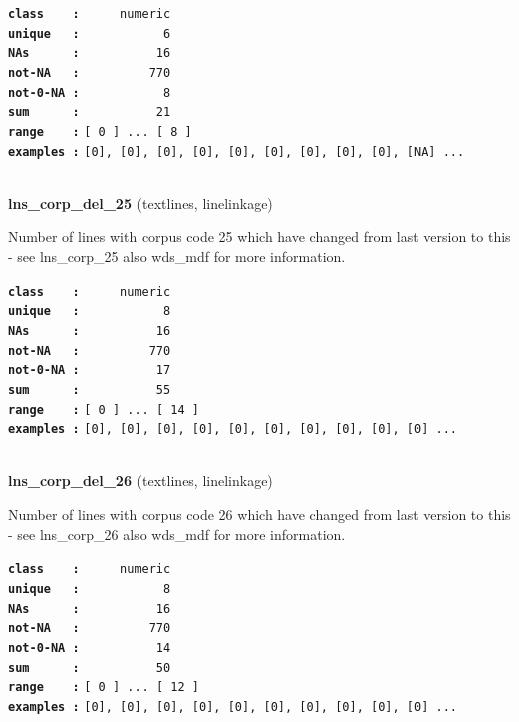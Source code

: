 \documentclass[]{article}
\begin{document}
\textbf{\texttt{class\ \ \ \ :}} \texttt{~~~~~numeric}\\
\textbf{\texttt{unique\ \ \ :}} \texttt{~~~~~~~~~~~6}\\
\textbf{\texttt{NAs\ \ \ \ \ \ :}} \texttt{~~~~~~~~~~16}\\
\textbf{\texttt{not-NA\ \ \ :}} \texttt{~~~~~~~~~770}\\
\textbf{\texttt{not-0-NA\ :}} \texttt{~~~~~~~~~~~8}\\
\textbf{\texttt{sum\ \ \ \ \ \ :}} \texttt{~~~~~~~~~~21}\\
\textbf{\texttt{range\ \ \ \ :}}
\texttt{{[}\ 0\ {]}\ ...\ {[}\ 8\ {]}}\\
\textbf{\texttt{examples\ :}}
\texttt{{[}0{]},\ {[}0{]},\ {[}0{]},\ {[}0{]},\ {[}0{]},\ {[}0{]},\ {[}0{]},\ {[}0{]},\ {[}0{]},\ {[}NA{]}\ ...}\\

~

\textbf{lns\_corp\_del\_25} (textlines, linelinkage)

Number of lines with corpus code 25 which have changed from last version
to this - see lns\_corp\_25 also wds\_mdf for more information.

\textbf{\texttt{class\ \ \ \ :}} \texttt{~~~~~numeric}\\
\textbf{\texttt{unique\ \ \ :}} \texttt{~~~~~~~~~~~8}\\
\textbf{\texttt{NAs\ \ \ \ \ \ :}} \texttt{~~~~~~~~~~16}\\
\textbf{\texttt{not-NA\ \ \ :}} \texttt{~~~~~~~~~770}\\
\textbf{\texttt{not-0-NA\ :}} \texttt{~~~~~~~~~~17}\\
\textbf{\texttt{sum\ \ \ \ \ \ :}} \texttt{~~~~~~~~~~55}\\
\textbf{\texttt{range\ \ \ \ :}}
\texttt{{[}\ 0\ {]}\ ...\ {[}\ 14\ {]}}\\
\textbf{\texttt{examples\ :}}
\texttt{{[}0{]},\ {[}0{]},\ {[}0{]},\ {[}0{]},\ {[}0{]},\ {[}0{]},\ {[}0{]},\ {[}0{]},\ {[}0{]},\ {[}0{]}\ ...}\\

~

\textbf{lns\_corp\_del\_26} (textlines, linelinkage)

Number of lines with corpus code 26 which have changed from last version
to this - see lns\_corp\_26 also wds\_mdf for more information.

\textbf{\texttt{class\ \ \ \ :}} \texttt{~~~~~numeric}\\
\textbf{\texttt{unique\ \ \ :}} \texttt{~~~~~~~~~~~8}\\
\textbf{\texttt{NAs\ \ \ \ \ \ :}} \texttt{~~~~~~~~~~16}\\
\textbf{\texttt{not-NA\ \ \ :}} \texttt{~~~~~~~~~770}\\
\textbf{\texttt{not-0-NA\ :}} \texttt{~~~~~~~~~~14}\\
\textbf{\texttt{sum\ \ \ \ \ \ :}} \texttt{~~~~~~~~~~50}\\
\textbf{\texttt{range\ \ \ \ :}}
\texttt{{[}\ 0\ {]}\ ...\ {[}\ 12\ {]}}\\
\textbf{\texttt{examples\ :}}
\texttt{{[}0{]},\ {[}0{]},\ {[}0{]},\ {[}0{]},\ {[}0{]},\ {[}0{]},\ {[}0{]},\ {[}0{]},\ {[}0{]},\ {[}0{]}\ ...}\\
\end{document}
